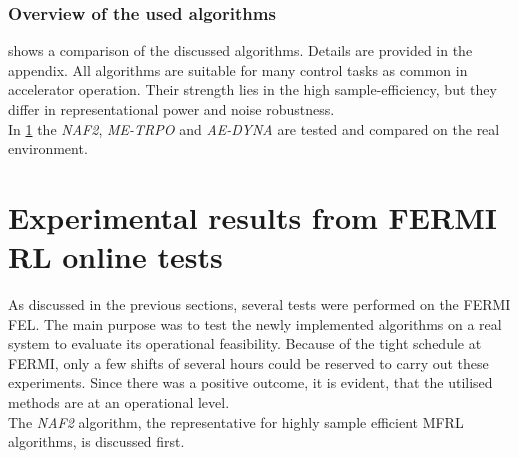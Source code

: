 \documentclass[
reprint,
amsmath,amssymb,amsfonts,clevref,
aps,
prstab,
]{revtex4-2}
\begin{document}
	\subsubsection{Overview of the used algorithms}
	 shows a comparison of the discussed algorithms. Details are provided in the appendix. All algorithms are suitable for many control tasks as common in accelerator operation. Their strength lies in the high sample-efficiency, but they differ in representational power and noise robustness. \\
	In \cref{sec:Experimental results from FERMI RL online tests} the \emph{NAF2},
	\emph{ME-TRPO} and \emph{AE-DYNA} are tested and compared on the real environment.
\begin{table}[b]%
	\caption{\label{tab:overview_algorithms}%
		An overview of the algorithms discussed in this paper.
	}
\end{table}


	\section{Experimental results from FERMI RL online tests}\label{sec:Experimental results from FERMI RL online tests}
	As discussed in the previous sections, several tests were performed on the FERMI FEL.
	The main purpose was to test the newly implemented algorithms on a real system to evaluate its operational feasibility. 
	Because of the tight schedule at FERMI, only a few shifts of several hours could be reserved to carry out these experiments. Since there was a positive outcome, it is evident, that the utilised methods are at an operational level.\\
	The \emph{NAF2} algorithm, the representative for highly sample efficient MFRL algorithms, is discussed first.
\end{document}
